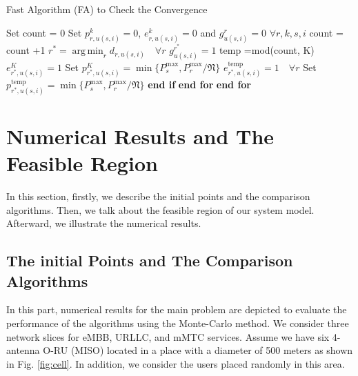 \documentclass[lettersize,journal]{IEEEtran}
\DeclareMathOperator*{\argmin}{arg\,min}
\begin{document}
 \begin{algorithm}
 \small
\caption{Fast Algorithm (FA) to Check the Convergence}\label{alg3}
\begin{algorithmic}[1]
\State Set count = 0
\State Set $p_{r,u(s,i)}^{k} = 0$, $e_{r,u(s,i)}^{k} = 0$ and $g_{u(s,i)}^{r} = 0$ $\forall r,k,s,i$
\State count = count +1
\State $r^* = \argmin_r d_{r,u(s,i)} \quad \forall r$
\State $g_{u(s,i)} ^{r^*}=1$
\State temp =mod(count, K)
\State $e_{r^*,u(s,i)}^{K} = 1 $
\State Set $p_{r^*,u(s,i)}^{K} = \min\{P_s^{\max}, P_r^{\max}/\mathfrak{N}\} $
\Else
\State $e_{r^*,u(s,i)}^{\text{temp}} = 1 \quad \forall r$
\State Set $p_{r^*,u(s,i)}^{\text{temp}} = \min\{P_s^{\max}, P_r^{\max}/\mathfrak{N}\} $
\EndIf
\State \textbf{end if}
\EndFor
\State \textbf{end for}
\EndFor
\State \textbf{end for}
\end{algorithmic}
\end{algorithm}
\section{Numerical Results and The Feasible Region}\label{NE}
In this section, firstly, we describe the initial points and the comparison algorithms.
Then, we talk about the feasible region of our system model. Afterward, we illustrate the numerical results.
\subsection{The initial Points and The Comparison Algorithms}
In this part, numerical results for the main problem are depicted to evaluate the performance of the algorithms using the Monte-Carlo method. We consider three network slices for eMBB, URLLC, and mMTC services.
Assume we have six 4-antenna O-RU (MISO) located in a place with a diameter of 500 meters as shown in Fig. \ref{fig:cell}. In addition, we consider the users placed randomly in this area.
\end{document}
